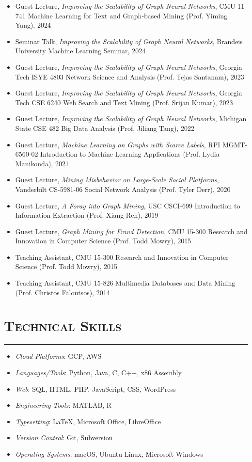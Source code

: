\documentclass{article}
\newcommand{\HRule}{\rule{\linewidth}{0.5mm}}
\begin{document}
\begin{itemize}
\item Guest Lecture, \emph{Improving the Scalability of Graph Neural Networks}, CMU 11-741 Machine Learning for Text and Graph-based Mining (Prof. Yiming Yang), 2024
\item Seminar Talk, \emph{Improving the Scalability of Graph Neural Networks}, Brandeis University Machine Learning Seminar, 2024
\item Guest Lecture, \emph{Improving the Scalability of Graph Neural Networks}, Georgia Tech ISYE 4803 Network Science and Analysis (Prof. Tejas Santanam), 2023
\item Guest Lecture, \emph{Improving the Scalability of Graph Neural Networks}, Georgia Tech CSE 6240 Web Search and Text Mining (Prof. Srijan Kumar), 2023
\item Guest Lecture, \emph{Improving the Scalability of Graph Neural Networks}, Michigan State CSE 482 Big Data Analysis (Prof. Jiliang Tang), 2022
\item Guest Lecture, \emph{Machine Learning on Graphs with Scarce Labels}, RPI MGMT-6560-02 Introduction to Machine Learning Applications (Prof. Lydia Manikonda), 2021
\item Guest Lecture, \emph{Mining Misbehavior on Large-Scale Social Platforms}, Vanderbilt CS-5981-06 Social Network Analysis (Prof. Tyler Derr), 2020
\item Guest Lecture, \emph{A Foray into Graph Mining}, USC CSCI-699 Introduction to Information Extraction (Prof. Xiang Ren), 2019
\item Guest Lecture, \emph{Graph Mining for Fraud Detection}, CMU 15-300 Research and Innovation in Computer Science (Prof. Todd Mowry), 2015
\item Teaching Assistant, CMU 15-300 Research and Innovation in Computer Science (Prof. Todd Mowry), 2015
\item Teaching Assistant, CMU 15-826 Multimedia Databases and Data Mining (Prof. Christos Faloutsos), 2014
\end{itemize}

\section*{\bf \textsc{Technical Skills}}
\vspace{-5mm}\HRule
\begin{itemize}
\item \emph{Cloud Platforms}: GCP, AWS
\item \emph{Languages/Tools}: Python, Java, C, C++, x86 Assembly
\item \emph{Web}: SQL, HTML, PHP, JavaScript, CSS, WordPress
\item \emph{Engineering Tools}: MATLAB, R
\item \emph{Typesetting}: LaTeX, Microsoft Office, LibreOffice
\item \emph{Version Control}: Git, Subversion
\item \emph{Operating Systems}: macOS, Ubuntu Linux, Microsoft Windows
\end{itemize}
\end{document}
